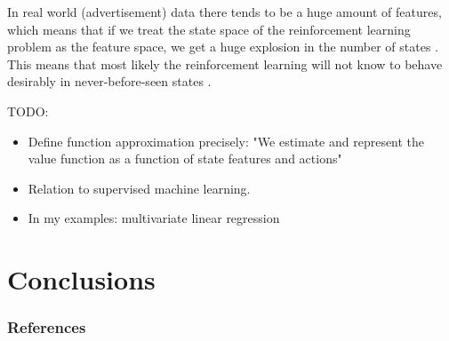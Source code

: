 \documentclass{article} %
\begin{document}
In real world (advertisement) data there tends to be a huge amount of features,
which means that if we treat the state space of the reinforcement learning
problem as the feature space, we get a huge explosion in the number of states
\cite{abe2002empirical}.  This means that most likely the reinforcement
learning will not know to behave desirably in never-before-seen states
\cite{book}.

TODO:
\begin{itemize}
  \item{Define function approximation precisely: "We estimate and represent the
    value function as a function of state features and actions"}
  \item{Relation to supervised machine learning.}
  \item{In my examples: multivariate linear regression}
\end{itemize}


\section{Conclusions}

\subsubsection*{References}
\nocite{*}

\printbibliography[heading=none]
\end{document}
